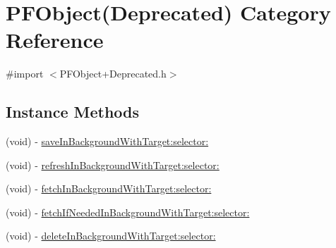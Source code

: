 \hypertarget{category_p_f_object_07_deprecated_08}{}\section{P\+F\+Object(Deprecated) Category Reference}
\label{category_p_f_object_07_deprecated_08}


{\ttfamily \#import $<$P\+F\+Object+\+Deprecated.\+h$>$}

\subsection*{Instance Methods}
\begin{DoxyCompactItemize}
\item 
(void) -\/ \hyperlink{category_p_f_object_07_deprecated_08_a26f570270d7ef495ba0de01fd6518fe9}{save\+In\+Background\+With\+Target\+:selector\+:}
\begin{DoxyCompactList}\small\item\em 

 \end{DoxyCompactList}\item 
(void) -\/ \hyperlink{category_p_f_object_07_deprecated_08_ac412f8feeb1d679db129dbb78efde1af}{refresh\+In\+Background\+With\+Target\+:selector\+:}
\begin{DoxyCompactList}\small\item\em 

 \end{DoxyCompactList}\item 
(void) -\/ \hyperlink{category_p_f_object_07_deprecated_08_af3eacaaeffebd4cc0ba339d765a50ade}{fetch\+In\+Background\+With\+Target\+:selector\+:}
\item 
(void) -\/ \hyperlink{category_p_f_object_07_deprecated_08_acfcb1ff704744d8706dd63a5a17ca43a}{fetch\+If\+Needed\+In\+Background\+With\+Target\+:selector\+:}
\item 
(void) -\/ \hyperlink{category_p_f_object_07_deprecated_08_acdf9948630cfbfb6a2caa0aecfbf58cf}{delete\+In\+Background\+With\+Target\+:selector\+:}
\begin{DoxyCompactList}\small\item\em 

 \end{DoxyCompactList}\end{DoxyCompactItemize}
